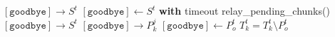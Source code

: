 \documentclass{article}
\begin{document}
\pagestyle{empty}

\newcommand{\send}{\Rightarrow}
\newcommand{\sendto}{\rightarrow}
\algrenewcommand{}

\begin{algorithmic}

  \Repeat
  \State $[\mathtt{goodbye}] \sendto S^t$
  \State $[\mathtt{goodbye}] \gets S^t$ \textbf{with} timeout
  \State relay\_pending\_chunks()
  \State $[\mathtt{goodbye}] \sendto S^t$
  \State $[\mathtt{goodbye}] \sendto P^j_k$
  \EndFor
  \EndProcedure
  \newline
  \State $[\mathtt{goodbye}] \gets P^t_o$
  \State $T^t_k = T^t_k \setminus P^ t_o$
  \EndWhile
  \EndProcedure
  
\end{algorithmic}
\end{document}
